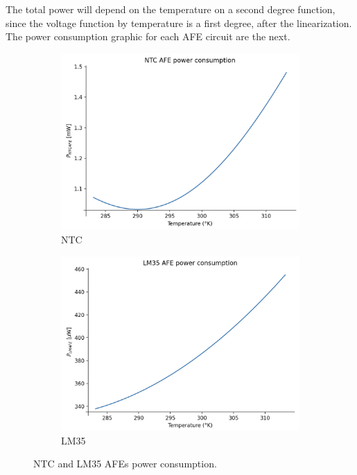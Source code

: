 \documentclass[12pt]{article}
\begin{document}
    The total power will depend on the temperature on a second degree function, since the voltage function by temperature is a first degree, after the linearization.
    The power consumption graphic for each AFE circuit are the next.

    \begin{figure}[h]
        \centering
        \begin{subfigure}{0.45\textwidth}
            \centering
            \includegraphics[width=\textwidth]{images/PowerNTC.png}
            \caption{ NTC }
        \end{subfigure}\hfill
        \begin{subfigure}{0.45\textwidth}
            \centering
            \includegraphics[width=\textwidth]{images/PowerLM.png}
            \caption{ LM35 }
        \end{subfigure}
        \caption{NTC and LM35 AFEs power consumption.}
    \end{figure}
\end{document}
